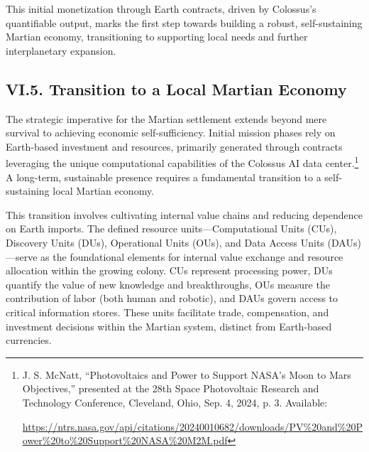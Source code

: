 \documentclass[fontsize=10pt, oneside, DIV=calc]{scrartcl}
\begin{document}
\medskip

\noindent
This initial monetization through Earth contracts, driven by Colossus's quantifiable output, marks the first step towards building a robust, self-sustaining Martian economy, transitioning to supporting local needs and further interplanetary expansion.



\subsection*{VI.5. Transition to a Local Martian Economy}



The strategic imperative for the Martian settlement extends beyond mere survival to achieving economic self-sufficiency. Initial mission phases rely on Earth-based investment and resources, primarily generated through contracts leveraging the unique computational capabilities of the Colossus AI data center.\footnote{J. S. McNatt, ``Photovoltaics and Power to Support NASA’s Moon to Mars Objectives,'' presented at the 28th Space Photovoltaic Research and Technology Conference, Cleveland, Ohio, Sep. 4, 2024, p. 3. Available: 







\href{https://ntrs.nasa.gov/api/citations/20240010682/downloads/PV\%20and\%20Power\%20to\%20Support\%20NASA\%20M2M.pdf}\url{https://ntrs.nasa.gov/api/citations/20240010682/downloads/PV\%20and\%20Power\%20to\%20Support\%20NASA\%20M2M.pdf}} A long-term, sustainable presence requires a fundamental transition to a self-sustaining local Martian economy.

\medskip

\noindent
This transition involves cultivating internal value chains and reducing dependence on Earth imports. The defined resource units---Computational Units (CUs), Discovery Units (DUs), Operational Units (OUs), and Data Access Units (DAUs)---serve as the foundational elements for internal value exchange and resource allocation within the growing colony. CUs represent processing power, DUs quantify the value of new knowledge and breakthroughs, OUs measure the contribution of labor (both human and robotic), and DAUs govern access to critical information stores. These units facilitate trade, compensation, and investment decisions within the Martian system, distinct from Earth-based currencies.
\end{document}
